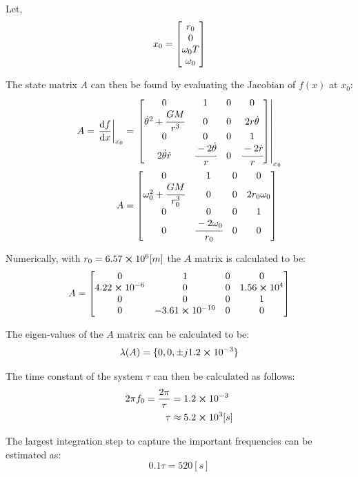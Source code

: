 \documentclass[]{article}
\begin{document}
		Let,
		\begin{equation}
			x_0 = \mqty[r_0\\ 0 \\ \omega_0 T \\ \omega_0]
		\end{equation}
		
		The state matrix $A$ can then be found by evaluating the Jacobian of $f(x)$ at $x_0$:
		\begin{align}
			A = \eval{\dv{f}{x}}_{x_0}
				&= \eval{\mqty[0 & 1 & 0 &0\\
						\dot{\theta}^2 + \cfrac{G M}{r^3}	&0 &0 & 2 r \dot{\theta}\\
						0	&0	&0	&1\\
						2\dot{\theta}\dot{r}	&\cfrac{-2\dot{\theta}}{r} &0 &	\cfrac{-2\dot{r}}{r}			
								]}_{x_0} \nonumber \\
			A	&= \mqty[0 & 1 & 0 &0\\
						\omega_0^2 + \cfrac{G M}{r_0^3}	&0 &0 & 2 r_0 \omega_0\\
						0	&0	&0	&1\\
						0	&\cfrac{-2\omega_0}{r_0} &0 &	0]
		\end{align}
		
		Numerically, with $r_0 = 6.57 \cross 10^6 [m]$ the $A$ matrix is calculated to be:
		\begin{equation}
			A = \mqty[0                    & 1                     & 0 & 0                \\
						4.22\cross 10^{-6} & 0                     & 0 & 1.56\cross 10^4 \\
						0                    & 0                     & 0 & 1                \\
						0                    & -3.61 \cross 10^{-10} & 0 & 0      ]
		\end{equation}
		
		The eigen-values of the $A$ matrix can be calculated to be:
		\begin{equation}
			\lambda(A) = \{0,0,\pm j 1.2 \cross 10^{-3}\}
		\end{equation}
		
		The time constant of the system $\tau$ can then be calculated as follows:
		\begin{align}
			2 \pi f_0 = \frac{2 \pi}{\tau} &= 1.2 \cross 10^{-3} \nonumber\\
			\tau &\approx 5.2 \cross 10^3 [s]
		\end{align}
		
		The largest integration step to capture the important frequencies can be estimated as:
		\begin{equation}
			0.1 \tau = 520 [s]
		\end{equation}
		
\end{document}
